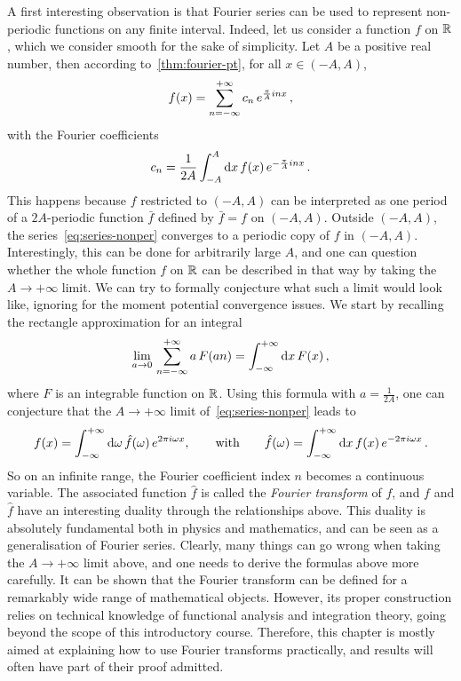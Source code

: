 A first interesting observation is that Fourier series can be used to represent
non-periodic functions on any finite interval. Indeed, let us consider a function $f$ on
$\mathbb{R}$, which we consider smooth for the sake of simplicity. Let $A$ be a positive real
number, then according to~\cref{thm:fourier-pt}, for all $x\in(-A,A)$,
\begin{equation}
	f(x)=\sum_{n=-\infty}^{+\infty}c_n\,e^{\frac{\pi}{A}inx}\,,\label{eq:series-nonper}
\end{equation}
with the Fourier coefficients
\begin{equation}
	c_n=\frac{1}{2A}\int_{-A}^{A}\mathrm{d} x\,f(x)\,e^{-\frac{\pi}{A}inx}\,.\label{eq:cn-nonper}
\end{equation}
This happens because $f$ restricted to $(-A,A)$ can be interpreted as one period of a
$2A$-periodic function $\bar{f}$ defined by $\bar{f}=f$ on $(-A,A)$. Outside $(-A,A)$, the
series~\cref{eq:series-nonper} converges to a periodic copy of $f$ in $(-A,A)$.
Interestingly, this can be done for arbitrarily large $A$, and one can question whether
the whole function $f$ on $\mathbb{R}$ can be described in that way by taking the $A\to+\infty$
limit. We can try to formally conjecture what such a limit would look like, ignoring for
the moment potential convergence issues. We start by recalling the rectangle approximation
for an integral
\begin{equation}
	\lim_{a\to0}\,\sum_{n=-\infty}^{+\infty}a\,F(an)=\int_{-\infty}^{+\infty}\mathrm{d} x\, F(x)\,,
\end{equation}
where $F$ is an integrable function on $\mathbb{R}$. Using this formula with $a=\frac{1}{2A}$, one
can conjecture that the $A\to+\infty$ limit of~\cref{eq:series-nonper} leads to
\begin{equation}
	\label{eq:ft-conjecture}
	f(x)=\int_{-\infty}^{+\infty}\mathrm{d}\omega\,\hat{f}(\omega)\,e^{2\pi i\omega x},
	\qquad\text{with}\qquad
	\hat{f}(\omega)=\int_{-\infty}^{+\infty}\mathrm{d} x\,f(x)\,e^{-2\pi i\omega x}\,.
\end{equation}
So on an infinite range, the Fourier coefficient index $n$ becomes a continuous variable.
The associated function $\hat{f}$ is called the \emph{Fourier transform} of $f$, and $f$
and $\hat{f}$ have an interesting duality through the relationships above. This duality is
absolutely fundamental both in physics and mathematics, and can be seen as a
generalisation of Fourier series. Clearly, many things can go wrong when taking the
$A\to+\infty$ limit above, and one needs to derive the formulas above more carefully. It
can be shown that the Fourier transform can be defined for a remarkably wide range of
mathematical objects. However, its proper construction relies on technical knowledge of
functional analysis and integration theory, going beyond the scope of this introductory
course. Therefore, this chapter is mostly aimed at explaining how to use Fourier
transforms practically, and results will often have part of their proof admitted.

